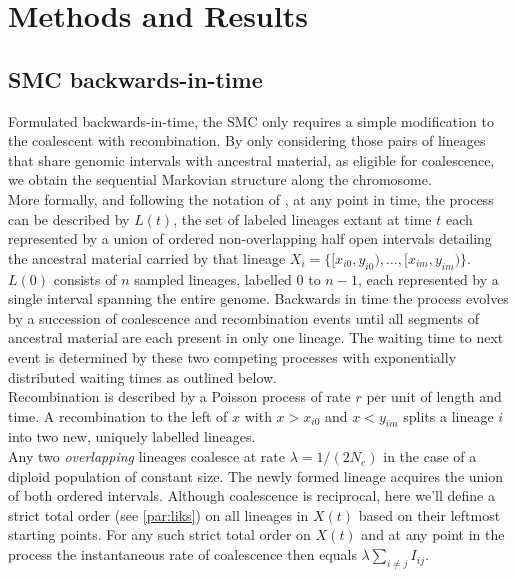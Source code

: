 \documentclass{article}
\begin{document}
\section{Methods and Results}
\subsection{SMC backwards-in-time}\label{par:description}

Formulated backwards-in-time, the SMC \citep{mcvean_approximating_2005} only requires a 
simple modification to the 
coalescent with recombination. By only considering those pairs of 
lineages that share 
genomic intervals with ancestral material, as eligible for coalescence, we obtain the 
sequential Markovian structure along the chromosome.\\

More formally, and following the notation of \citet{mcvean_approximating_2005}, at any 
point in time, the process can be described by $L(t)$, the set of labeled lineages 
extant at time $t$ each represented by a union of ordered non-overlapping half open 
intervals detailing the ancestral material 
carried by that lineage $X_i = \{[x_{i0}, y_{i0}), \dotsc, [x_{im}, y_{im})\}$.
$L(0)$ consists of $n$ sampled lineages, labelled $0$ to $n-1$, each represented by a 
single interval spanning the entire genome.
Backwards in time the process evolves by a succession of coalescence and recombination 
events until all segments of ancestral material are each present in only one lineage. 
The waiting time to next event is determined by these two competing processes with exponentially 
distributed waiting times as outlined below.\\

Recombination is described by a Poisson process of rate $r$ per unit of length and time. 
A recombination to the 
left of $x$ with $x>x_{i0}$ and $x<y_{im}$ splits a lineage $i$ into two new, uniquely 
labelled lineages.\\

Any two \emph{overlapping} lineages coalesce at rate $\lambda = 1/(2N_e)$ in the case
of a diploid population of constant size. The newly formed lineage acquires the 
union of both ordered intervals.
Although coalescence is reciprocal, here we'll define a strict total order 
(see \ref{par:liks}) on 
all lineages in $X(t)$ based on their leftmost starting points. 
For any such strict total order on $X(t)$ and at any point in the process 
the instantaneous rate of coalescence then equals $\lambda \sum_{i \neq j} I_{ij}$.
\end{document}
